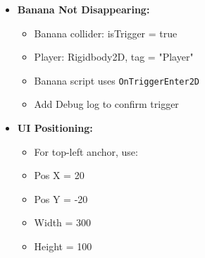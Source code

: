 \documentclass[11pt]{article}
\begin{document}
\begin{itemize}
		\item \textbf{Banana Not Disappearing:}
		\begin{itemize}
			\item Banana collider: isTrigger = true
			\item Player: Rigidbody2D, tag = "Player"
			\item Banana script uses \texttt{OnTriggerEnter2D}
			\item Add Debug log to confirm trigger
		\end{itemize}
		\item \textbf{UI Positioning:}
		\begin{itemize}
			\item For top-left anchor, use:
			\item Pos X = 20
			\item Pos Y = -20
			\item Width = 300
			\item Height = 100
		\end{itemize}
	\end{itemize}
	
\end{document}
